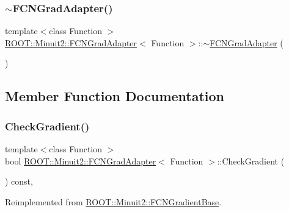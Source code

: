 \subsubsection{\texorpdfstring{$\sim$FCNGradAdapter()}{~FCNGradAdapter()}\hspace{0.1cm}{\footnotesize\ttfamily [3/3]}}
{\footnotesize\ttfamily template$<$class Function $>$ \\
\mbox{\hyperlink{classROOT_1_1Minuit2_1_1FCNGradAdapter}{R\+O\+O\+T\+::\+Minuit2\+::\+F\+C\+N\+Grad\+Adapter}}$<$ Function $>$\+::$\sim$\mbox{\hyperlink{classROOT_1_1Minuit2_1_1FCNGradAdapter}{F\+C\+N\+Grad\+Adapter}} (\begin{DoxyParamCaption}{ }\end{DoxyParamCaption})\hspace{0.3cm}{\ttfamily [inline]}}



\subsection{Member Function Documentation}
\mbox{\label{classROOT_1_1Minuit2_1_1FCNGradAdapter_a10faf0c868284a440f291465b7efd08e}} 
\subsubsection{\texorpdfstring{CheckGradient()}{CheckGradient()}\hspace{0.1cm}{\footnotesize\ttfamily [1/3]}}
{\footnotesize\ttfamily template$<$class Function $>$ \\
bool \mbox{\hyperlink{classROOT_1_1Minuit2_1_1FCNGradAdapter}{R\+O\+O\+T\+::\+Minuit2\+::\+F\+C\+N\+Grad\+Adapter}}$<$ Function $>$\+::Check\+Gradient (\begin{DoxyParamCaption}{ }\end{DoxyParamCaption}) const\hspace{0.3cm}{\ttfamily [inline]}, {\ttfamily [virtual]}}



Reimplemented from \mbox{\hyperlink{classROOT_1_1Minuit2_1_1FCNGradientBase_ae69375c7506f0be6a1ab4e4e937ac555}{R\+O\+O\+T\+::\+Minuit2\+::\+F\+C\+N\+Gradient\+Base}}.

